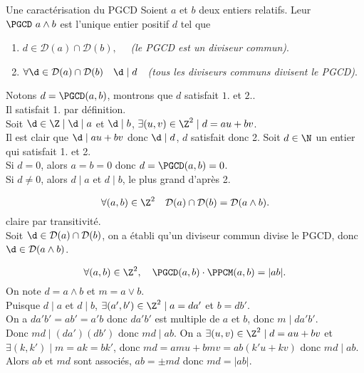 \documentclass[11pt]{article}
\renewcommand*{\D}{\mathcal{D}}
\begin{document}
\begin{thm}{Une caractérisation du PGCD}{}
    Soient $a$ et $b$ deux entiers relatifs. Leur $\PGCD~a\land b$ est l'unique entier positif $d$ tel que
    \begin{enumerate}[topsep=0pt,itemsep=-0.9 ex]
        \item $d\in\D(a)\cap\D(b),\quad$ \emph{(le PGCD est un diviseur commun)}.
        \item $\forall \d\in\D(a)\cap\D(b)\quad\d\mid d\quad$\emph{(tous les diviseurs communs divisent le PGCD)}.
    \end{enumerate}
    \tcblower
    Notons $d=\PGCD(a,b)$, montrons que $d$ satisfait $1.$ et $2.$.\\
    Il satisfait 1. par définition.\\
    Soit $\d\in\Z\mid\d\mid a$ et $\d\mid b$, $\exists (u,v)\in\Z^2\mid d=au+bv$.\\
    Il est clair que $\d\mid au+bv$ donc $\d\mid d$, $d$ satisfait donc 2.\n
    Soit $d\in\N$ un entier qui satisfait 1. et 2.\\
    Si $d=0$, alors $a=b=0$ donc $d=\PGCD(a,b)=0$.\\
    Si $d\neq0$, alors $d\mid a$ et $d\mid b$, le plus grand d'après 2.
\end{thm}

\begin{corr}{}{}
    \begin{equation*}
        \forall(a,b)\in\Z^2\quad\D(a)\cap\D(b)=\D(a\land b).
    \end{equation*}
    \tcblower
    \fbox{$\supset$} claire par transitivité.\\
    \fbox{$\subset$} Soit $\d\in\D(a)\cap\D(b)$, on a établi qu'un diviseur commun divise le PGCD, donc $\d\in\D(a\land b)$.
\end{corr}

\begin{prop}{}{}
    \begin{equation*}
        \forall(a,b)\in\Z^2,\quad\PGCD(a,b)\cdot\PPCM(a,b)=|ab|.
    \end{equation*}
    \tcblower
    On note $d=a\land b$ et $m=a\lor b$.\\
    Puisque $d\mid a$ et $d\mid b$, $\exists (a',b')\in\Z^2\mid a=da'$ et $b=db'$.\\
    On a $da'b'=ab'=a'b$ donc $da'b'$ est multiple de $a$ et $b$, donc $m\mid da'b'$.\\
    Donc $md\mid (da')(db')$ donc $md\mid ab$.\n
    On a $\exists (u,v)\in\Z^2\mid d=au+bv$ et $\exists (k,k')\mid m=ak=bk'$, donc $md=amu+bmv=ab(k'u+kv)$ donc $md\mid ab$.\n
    Alors $ab$ et $md$ sont associés, $ab=\pm md$ donc $md=|ab|$. 
\end{prop}
\end{document}
